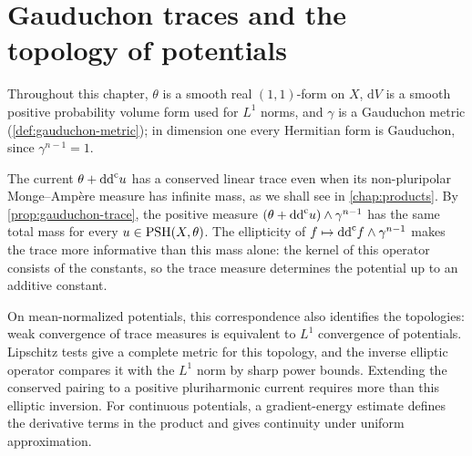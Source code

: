 \chapter{Gauduchon traces and the topology of potentials}
\label{chap:compactness}

Throughout this chapter, $\theta$ is a smooth real $(1,1)$-form on $X$, $\mathrm{d}V$ is a smooth positive probability volume form used for $L^1$ norms, and $\gamma$ is a Gauduchon metric (\cref{def:gauduchon-metric}); in dimension one every Hermitian form is Gauduchon, since $\gamma^{n-1}=1$.

The current $\theta+\mathrm{dd}^{\mathrm{c}} u$ has a conserved linear trace even when its non-pluripolar Monge--Amp\`ere measure has infinite mass, as we shall see in \cref{chap:products}. By \cref{prop:gauduchon-trace}, the positive measure $(\theta+\mathrm{dd}^{\mathrm{c}} u)\wedge\gamma^{n-1}$ has the same total mass for every $u\in\mathrm{PSH}(X,\theta)$. The ellipticity of $f\mapsto\mathrm{dd}^{\mathrm{c}} f\wedge\gamma^{n-1}$ makes the trace more informative than this mass alone: the kernel of this operator consists of the constants, so the trace measure determines the potential up to an additive constant.

On mean-normalized potentials, this correspondence also identifies the topologies: weak convergence of trace measures is equivalent to $L^1$ convergence of potentials. Lipschitz tests give a complete metric for this topology, and the inverse elliptic operator compares it with the $L^1$ norm by sharp power bounds. Extending the conserved pairing to a positive pluriharmonic current requires more than this elliptic inversion. For continuous potentials, a gradient-energy estimate defines the derivative terms in the product and gives continuity under uniform approximation.


